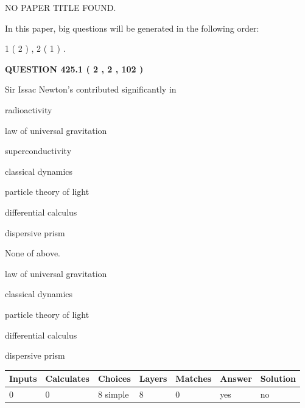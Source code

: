 \documentclass[12pt]{article}
\begin{document}
   
   
   
 NO PAPER TITLE FOUND.
   
   
   
\vspace{0.2in}
   
In this paper, big questions will be generated in the following order: 
   
   
   1 ( 2 )
 ,
   2 ( 1 )
 .
  
\vspace{0.2in}
  
{\textbf{\Large{QUESTION
425.1 
 ( 2 , 2 , 102 )
}}}
  
  
Sir Issac Newton's contributed significantly in
 
 
radioactivity
 
 
law of universal gravitation
 
 
superconductivity
 
 
classical dynamics
 
 
particle theory of light
 
 
differential calculus
 
 
dispersive prism
 
 
 None of above.
 
 
\noindent{}
 
 
law of universal gravitation
 
 
classical dynamics
 
 
particle theory of light
 
 
differential calculus
 
 
dispersive prism
 
 
\noindent{}
 
 
   
   
   
   
\noindent\begin{tabular}{|l|l|l|l|l|l|l|}
 \hline
Inputs & Calculates & Choices & Layers & Matches & Answer & Solution \\ \hline
 0  & 
 0  & 
 8
  simple  
  & 
 8  & 
 0  & 
  yes & 
  no 
  \\ \hline
 \end{tabular}
   
\end{document}
